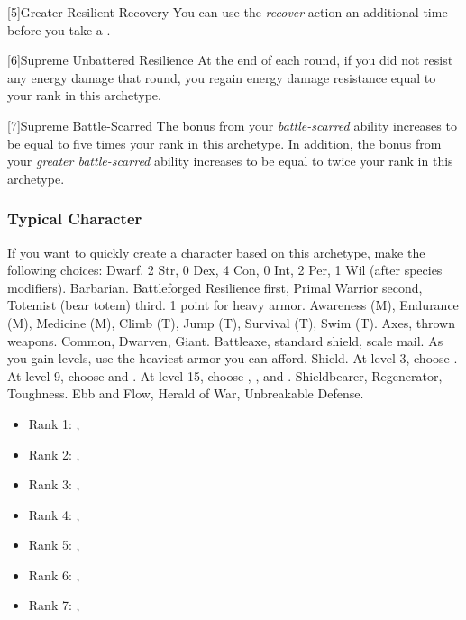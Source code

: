         [5]{Greater Resilient Recovery} You can use the \textit{recover} action an additional time before you take a .

        [6]{Supreme Unbattered Resilience} At the end of each round, if you did not resist any energy damage that round, you regain energy damage resistance equal to your rank in this archetype.

        [7]{Supreme Battle-Scarred} The bonus from your \textit{battle-scarred} ability increases to be equal to five times your rank in this archetype.
        In addition, the bonus from your \textit{greater battle-scarred} ability increases to be equal to twice your rank in this archetype.

        \subsubsection{Typical Character}
            If you want to quickly create a character based on this archetype, make the following choices:
             Dwarf.
             2 Str, 0 Dex, 4 Con, 0 Int, 2 Per, 1 Wil (after species modifiers).
             Barbarian.
             Battleforged Resilience first, Primal Warrior second, Totemist (bear totem) third.
             1 point for heavy armor.
             Awareness (M), Endurance (M), Medicine (M), Climb (T), Jump (T), Survival (T), Swim (T).
             Axes, thrown weapons.
             Common, Dwarven, Giant.
             Battleaxe, standard shield, scale mail. As you gain levels, use the heaviest armor you can afford.
             Shield.
                At level 3, choose .
                At level 9, choose  and .
                At level 15, choose , , and .
             Shieldbearer, Regenerator, Toughness.
             Ebb and Flow, Herald of War, Unbreakable Defense.
            \begin{itemize}
                \item Rank 1: , 
                \item Rank 2: , 
                \item Rank 3: , 
                \item Rank 4: , 
                \item Rank 5: , 
                \item Rank 6: , 
                \item Rank 7: , 
            \end{itemize}
